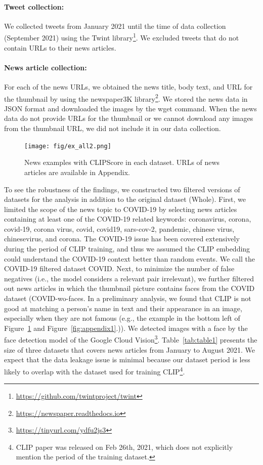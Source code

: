 \documentclass[11pt]{article}
\begin{document}
\paragraph{Tweet collection:}   
We collected tweets from January 2021 until the time of data collection (September 2021) using the Twint library\footnote{\url{https://github.com/twintproject/twint}}. We excluded tweets that do not contain URLs to their news articles.

\paragraph{News article collection:}
For each of the news URLs, we obtained the news title, body text, and URL for the thumbnail by using the newspaper3K library\footnote{\url{https://newspaper.readthedocs.io}}.
We stored the news data in JSON format and downloaded the images by the wget command. When the news data do not provide URLs for the thumbnail or we cannot download any images from the thumbnail URL, we did not include it in our data collection.

\begin{figure}[ht]
    \centering
    \texttt{[image: fig/ex\_all2.png]}
    \caption{News examples with CLIPScore in each dataset. URLs of news articles are available in Appendix.}
    \label{fig:examples}
\end{figure}

To see the robustness of the findings, we constructed two filtered versions of datasets for the analysis in addition to the original dataset (\textsf{Whole}). First, we limited the scope of the news topic to COVID-19 by selecting news articles containing at least one of the COVID-19 related keywords: coronavirus, corona, covid-19, corona virus, covid, covid19, sars-cov-2, pandemic, chinese virus, chinesevirus, and corona. The COVID-19 issue has been covered extensively during the period of CLIP training, and thus we assumed the CLIP embedding could understand the COVID-19 context better than random events. We call the COVID-19 filtered dataset \textsf{COVID}. Next, to minimize the number of false negatives (i.e., the model considers a relevant pair irrelevant), we further filtered out news articles in which the thumbnail picture contains faces from the COVID dataset (\textsf{COVID-wo-faces}. In a preliminary analysis, we found that CLIP is not good at matching a person's name in text and their appearance in an image, especially when they are not famous (e.g., the example in the bottom left of Figure~\ref{fig:examples} and Figure~\ref{fig:appendix1}.)). We detected images with a face by the face detection model of the Google Cloud Vision\footnote{\url{https://tinyurl.com/ydfu2js3}}. Table~\ref{tab:table1} presents the size of three datasets that covers news articles from January to August 2021. We expect that the data leakage issue is minimal because our dataset period is less likely to overlap with the dataset used for training CLIP\footnote{CLIP paper was released on Feb 26th, 2021, which does not explicitly mention the period of the training dataset.}.
\end{document}
